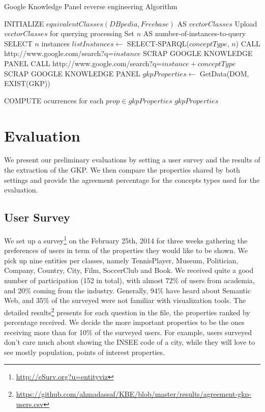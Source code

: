 \documentclass[runningheads,a4paper]{llncs}
\begin{document}
\begin{algorithm}[h]
\caption{Google Knowledge Panel reverse engineering Algorithm} \label{algoscrapping}
\begin{algorithmic}[1]
    \STATE INITIALIZE $equivalentClasses(DBpedia,Freebase) $ AS $vectorClasses$
    \STATE Upload $vectorClasses$ for querying processing
    \STATE Set $n$ AS number-of-instances-to-query
	\STATE SELECT $n$ instances
	\STATE $listInstances \leftarrow$ SELECT-SPARQL($conceptType$, $n$)
			\STATE CALL http://www.google.com/search?q=$instance$
				\STATE SCRAP GOOGLE KNOWLEDGE PANEL
			\ELSE 
				\STATE CALL http://www.google.com/search?q=$instance + conceptType$
 				\STATE SCRAP GOOGLE KNOWLEDGE PANEL
			\ENDIF
			\STATE $gkpProperties \leftarrow$ GetData(DOM, EXIST(GKP))
			
		\ENDFOR
	\STATE COMPUTE ocurrences for each $prop \in gkpProperties$
    \ENDFOR
    \RETURN $gkpProperties$
\end{algorithmic}
\end{algorithm}


\section{Evaluation}
\label{sec:evaluation}
We present our preliminary evaluations by setting a user survey and the results of the extraction of the GKP. We then compare the properties shared by both settings and provide the agreement percentage for the concepts types used for the evaluation.

\subsection{User Survey}
\label{sec:survey}
We set up a survey\footnote{\url{http://eSurv.org?u=entityviz}} on the February 25th, 2014 for three weeks gathering the preferences of users in term of the properties they would like to be shown. We pick up nine entities per classes, namely \textsf{TennisPlayer}, \textsf{Museum}, \textsf{Politician}, \textsf{Company}, \textsf{Country}, \textsf{City}, \textsf{Film}, \textsf{SoccerClub} and \textsf{Book}.
We received quite a good number of participation (152 in total), with almost 72\% of users from academia, and 20\% coming from the industry. Generally, 94\% have heard about Semantic Web, and 35\% of the surveyed were not familiar with visualization tools. The detailed results\footnote{\url{https://github.com/ahmadassaf/KBE/blob/master/results/agreement-gkp-users.csv}} presents for each question in the file, the properties ranked by percentage received. We decide the more important properties to be the ones receiving more than for 10\% of the surveyed users.  
 For example, users surveyed don't care much about showing the \textsf{INSEE code} of a city, while they will love to see mostly \textsf{population}, \textsf{points of interest} properties. 
\end{document}
